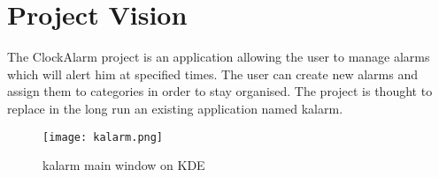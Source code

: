 \chapter{Project Vision}
The ClockAlarm project is an application allowing the user to manage alarms which will alert him at specified times. The user can create new alarms and assign them to categories in order to stay organised. The project is thought to replace in the long run an existing application named \gls{kalarm}.

\begin{figure}[h]
\centering
\caption{\gls{kalarm} main window on KDE}
\texttt{[image: kalarm.png]}
\end{figure}